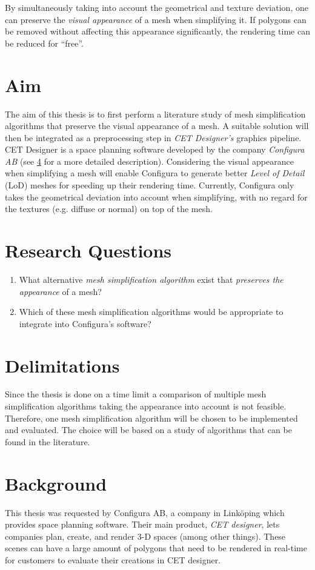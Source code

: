 By simultaneously taking into account the geometrical and texture deviation, one can preserve the \emph{visual appearance} of a mesh when simplifying it. If polygons can be removed without affecting this appearance significantly, the rendering time can be reduced for ``free''.

\section{Aim} \label{sec:aim}
The aim of this thesis is to first perform a literature study of mesh simplification algorithms that preserve the visual appearance of a mesh. A suitable solution will then be integrated as a preprocessing step in \emph{CET Designer's} graphics pipeline. CET Designer is a space planning software developed by the company \emph{Configura AB} (see \cref{sec:background} for a more detailed description). Considering the visual appearance when simplifying a mesh will enable Configura to generate better \emph{Level of Detail} (LoD) meshes for speeding up their rendering time. Currently, Configura only takes the geometrical deviation into account when simplifying, with no regard for the textures (e.g. diffuse or normal) on top of the mesh.


\section{Research Questions} \label{sec:research-questions}
\begin{enumerate}
\item What alternative \emph{mesh simplification algorithm} exist that \emph{preserves the appearance} of a mesh? 
\item Which of these mesh simplification algorithms would be appropriate to integrate into Configura's software?
\end{enumerate}

\section{Delimitations} \label{sec:delimitations}
Since the thesis is done on a time limit a comparison of multiple mesh simplification algorithms taking the appearance into account is not feasible. Therefore, one mesh simplification algorithm will be chosen to be implemented and evaluated. The choice will be based on a study of algorithms that can be found in the literature.

\section{Background} \label{sec:background}
This thesis was requested by Configura AB, a company in Linköping which provides space planning software. Their main product, \emph{CET designer}, lets companies plan, create, and render 3-D spaces (among other things). These scenes can have a large amount of polygons that need to be rendered in real-time for customers to evaluate their creations in CET designer. 

